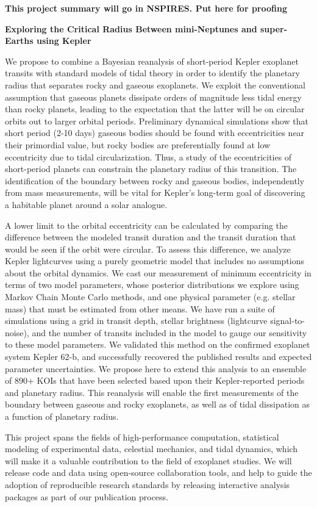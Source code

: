 \centerline{\bf This project summary will go in NSPIRES.  Put here for proofing} \medskip

\centerline{\bf Exploring the Critical Radius Between mini-Neptunes and super-Earths using Kepler} \medskip

We propose to combine a Bayesian reanalysis of short-period Kepler exoplanet transits with standard models of tidal theory in order to identify the planetary radius that separates rocky and gaseous exoplanets. We exploit the conventional assumption that gaseous planets dissipate orders of magnitude less tidal energy than rocky planets, leading to the expectation that the latter will be on circular orbits out to larger orbital periods. Preliminary dynamical simulations show that short period (2-10 days) gaseous bodies should be found with eccentricities near their primordial value, but rocky bodies are preferentially found at low eccentricity due to tidal circularization.  Thus, a study of the eccentricities of short-period planets can constrain the planetary radius of this transition.  The identification of the boundary between rocky and gaseous bodies, independently from mass measurements, will be vital for Kepler's long-term goal of discovering a habitable planet around a solar analogue.

A lower limit to the orbital eccentricity can be calculated by comparing the difference between the modeled transit duration and the transit duration that would be seen if the orbit were circular.  To assess this difference, we analyze Kepler lightcurves using a purely geometric model that includes no assumptions about the orbital dynamics.  We cast our measurement of minimum eccentricity in terms of two model parameters, whose posterior distributions we explore using Markov Chain Monte Carlo methods, and one physical parameter (e.g. stellar mass) that must be estimated from other means.  We have run a suite of simulations using a grid in transit depth, stellar brightness (lightcurve signal-to-noise), and the number of transits included in the model to gauge our sensitivity to these model parameters.  We validated this method on the confirmed exoplanet system Kepler 62-b, and successfully recovered the published results and expected parameter uncertainties. We propose here to extend this analysis to an ensemble of 890+ KOIs that have been selected based upon their Kepler-reported periods and planetary radius.  This reanalysis will enable the first measurements of the boundary between gaseous and rocky exoplanets, as well as of tidal dissipation as a function of planetary radius.

This project spans the fields of high-performance computation, statistical modeling of experimental data, celestial mechanics, and tidal dynamics, which will make it a valuable contribution to the field of exoplanet studies.  We will release code and data using open-source collaboration tools, and help to guide the adoption of reproducible research standards by releasing interactive analysis packages as part of our publication process.

